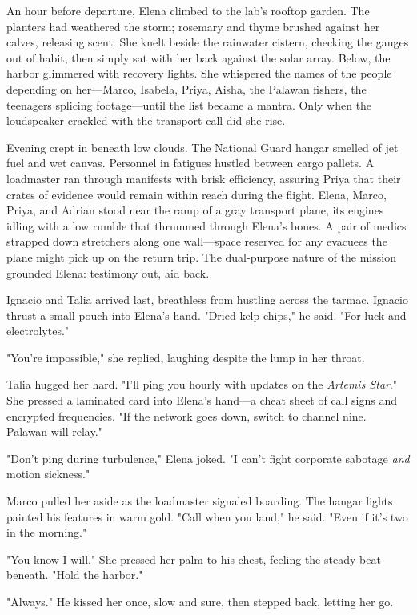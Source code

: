 \bigskip

An hour before departure, Elena climbed to the lab's rooftop garden. The planters had weathered the storm; rosemary and thyme brushed against her calves, releasing scent. She knelt beside the rainwater cistern, checking the gauges out of habit, then simply sat with her back against the solar array. Below, the harbor glimmered with recovery lights. She whispered the names of the people depending on her—Marco, Isabela, Priya, Aisha, the Palawan fishers, the teenagers splicing footage—until the list became a mantra. Only when the loudspeaker crackled with the transport call did she rise.

Evening crept in beneath low clouds. The National Guard hangar smelled of jet fuel and wet canvas. Personnel in fatigues hustled between cargo pallets. A loadmaster ran through manifests with brisk efficiency, assuring Priya that their crates of evidence would remain within reach during the flight. Elena, Marco, Priya, and Adrian stood near the ramp of a gray transport plane, its engines idling with a low rumble that thrummed through Elena's bones. A pair of medics strapped down stretchers along one wall—space reserved for any evacuees the plane might pick up on the return trip. The dual-purpose nature of the mission grounded Elena: testimony out, aid back.

Ignacio and Talia arrived last, breathless from hustling across the tarmac. Ignacio thrust a small pouch into Elena's hand. "Dried kelp chips," he said. "For luck and electrolytes."

"You're impossible," she replied, laughing despite the lump in her throat.

Talia hugged her hard. "I'll ping you hourly with updates on the \textit{Artemis Star}." She pressed a laminated card into Elena's hand—a cheat sheet of call signs and encrypted frequencies. "If the network goes down, switch to channel nine. Palawan will relay."

"Don't ping during turbulence," Elena joked. "I can't fight corporate sabotage \textit{and} motion sickness."

Marco pulled her aside as the loadmaster signaled boarding. The hangar lights painted his features in warm gold. "Call when you land," he said. "Even if it's two in the morning."

"You know I will." She pressed her palm to his chest, feeling the steady beat beneath. "Hold the harbor."

"Always." He kissed her once, slow and sure, then stepped back, letting her go.

